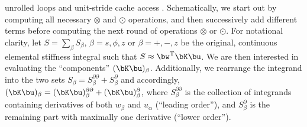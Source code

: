 unrolled loops and unit-stride cache access \citep{dfm}.
Schematically, we start out by computing all necessary $\otimes$ and $\odot$
operations, and then successively add different terms before
computing the next round of operations $\otimes$ or $\odot$.
%
For notational clarity, let $S=\sum_\beta S_\beta$, $\beta=s,\phi,z$
or $\beta=+,-,z$ be the original, continuous elemental stiffness integral
such that $S\approx\bw^{\rm{T}} \bK \bu$. We are then interested in evaluating
the ``components'' $(\bK\bu)_\beta$. Additionally, we rearrange the integrand
into the two sets
$S_\beta=S_{\beta}^{\partial\partial}+S_{\beta}^{\partial}$ and accordingly,
$(\bK\bu)_\beta=(\bK\bu)_\beta^{\partial\partial}+(\bK\bu)_\beta^{\partial}$,
where $S_{\beta}^{\partial\partial}$ is the collection of integrands
containing derivatives of both $w_\beta$ and $u_\alpha$ (``leading order''),
and $S_{\beta}^{\partial}$ is the remaining part with maximally one derivative
 (``lower order'').
%
%
